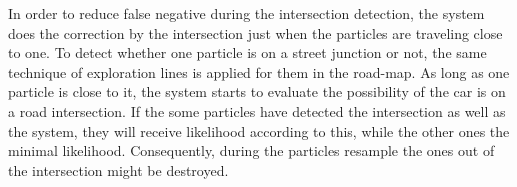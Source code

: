 In order to reduce false negative during the intersection detection, the system does the correction by the intersection just when the particles are traveling close to one. To detect whether one particle is on a street junction or not, the same technique of exploration lines is applied for them in the road-map. As long as one particle is close to it, the system starts to evaluate the possibility of the car is on a road intersection. If the some particles have detected the intersection as well as the system, they will receive likelihood according to this, while the other ones the minimal likelihood. Consequently, during the particles resample the ones out of the intersection might be destroyed.




